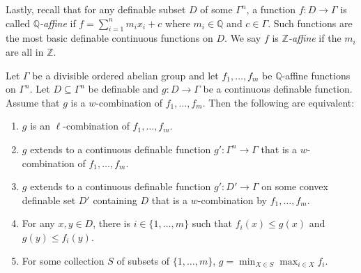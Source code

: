 \documentclass[JEP,XML,SOM,Unicode,ThmDefs,NoEqCountersInSection,published]{cedram}
\newcommand{\Q}{\mathbb Q}
\newcommand{\Z}{\mathbb Z}
\theoremstyle{plain}
\theoremstyle{definition}
\begin{document}
Lastly, recall that for any definable subset $D$ of some $\Gamma^n$, a function $f:D\to \Gamma$ is called \emph{$\Q$-affine} if $f=\sum^n_{i=1} m_ix_i+c$ where $m_i\in \Q$ and $c\in \Gamma$. Such functions are the most basic definable continuous functions on $D$. We say $f$ is \emph{$\Z$-affine} if the $m_i$ are all in $\Z$.
\begin{prop}\label{prop:t-l-equiv}
Let $\Gamma$ be a divisible ordered abelian group and let $f_1,\ldots,f_m$ be $\Q$-affine functions on $\Gamma^n$. Let $D\subseteq \Gamma^n$ be definable and $g:D\to \Gamma$ be a continuous definable function. Assume that $g$ is a $w$-combination of $f_1,\ldots,f_m$. Then the following are equivalent:
\begin{enumerate}
\item\label{prop:t-l-equiv1} $g$ is an $\ell$-combination of $f_1,\ldots,f_m$.
\item\label{prop:t-l-equiv2} $g$ extends to a continuous definable function $g':\Gamma^n\to \Gamma$ that is a $w$\nobreakdash-combi\-na\-tion of $f_1,\ldots,f_m$.
\item\label{prop:t-l-equiv3} $g$ extends to a continuous definable function $g':D'\to \Gamma$ on some convex definable set $D'$ containing $D$ that is a $w$-combination by $f_1,\ldots,f_m$.
\item\label{prop:t-l-equiv4} For any $x,y\!\in\! D$, there is $i \!\in\! \{1,\ldots,m\}$ such that $f_i(x)\!\leq\! g(x)$ and $g(y)\!\leq\! f_i(y)$.
\item\label{prop:t-l-equiv5} For some collection $S$ of subsets of $\{1,\ldots,m\}$, $g=\min_{X\in S} \max_{i \in X} f_i$.
\end{enumerate}
\end{prop}
\end{document}
